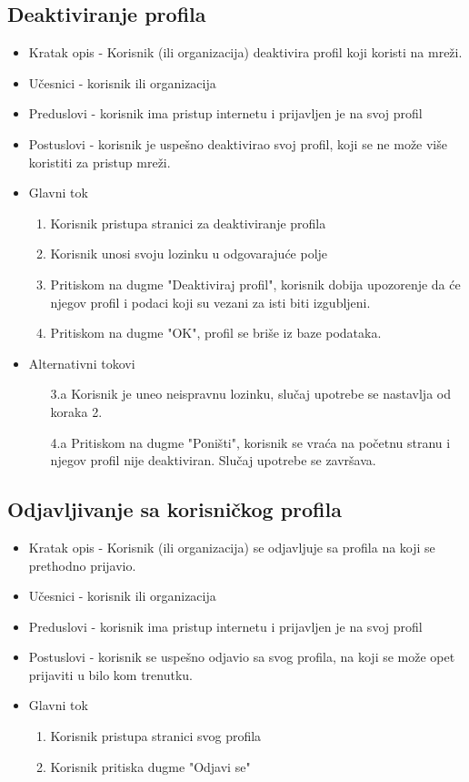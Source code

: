 \subsection{Deaktiviranje profila}
\begin{itemize}
	\item Kratak opis - Korisnik (ili organizacija) deaktivira profil koji koristi na mreži.
	\item Učesnici - korisnik ili organizacija
	\item Preduslovi - korisnik ima pristup internetu i prijavljen je na svoj profil
	\item Postuslovi - korisnik je uspešno deaktivirao svoj profil, koji se ne može više koristiti za pristup mreži.
	\item Glavni tok
		\begin{enumerate}
			\item Korisnik pristupa stranici za deaktiviranje profila
			\item Korisnik unosi svoju lozinku u odgovarajuće polje
			\item Pritiskom na dugme "Deaktiviraj profil", korisnik dobija upozorenje da će njegov profil i podaci koji su vezani za isti biti izgubljeni.
			\item Pritiskom na dugme "OK", profil se briše iz baze podataka.
		\end{enumerate}
	\item Alternativni tokovi
		\begin{itemize}
			\item[3.a] Korisnik je uneo neispravnu lozinku, slučaj upotrebe se nastavlja od koraka 2.
			\item[4.a] Pritiskom na dugme "Poništi", korisnik se vraća na početnu stranu i njegov profil nije deaktiviran. Slučaj upotrebe se završava.
		\end{itemize}
\end{itemize}

\subsection{Odjavljivanje sa korisničkog profila}
\begin{itemize}
	\item Kratak opis - Korisnik (ili organizacija) se odjavljuje sa profila na koji se prethodno prijavio.
	\item Učesnici - korisnik ili organizacija
	\item Preduslovi - korisnik ima pristup internetu i prijavljen je na svoj profil
	\item Postuslovi - korisnik se uspešno odjavio sa svog profila, na koji se može opet prijaviti u bilo kom trenutku.
	\item Glavni tok
		\begin{enumerate}
			\item Korisnik pristupa stranici svog profila
			\item Korisnik pritiska dugme "Odjavi se"
		\end{enumerate}
\end{itemize}

